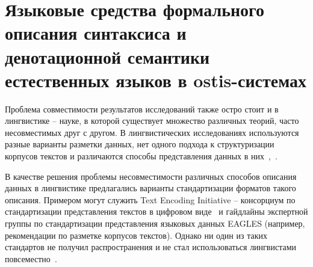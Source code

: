 \chapter{Языковые средства формального описания синтаксиса и денотационной семантики естественных языков в ostis-системах}
\label{chapter_lang}


Проблема совместимости результатов исследований также остро стоит и в лингвистике -- науке, в которой существует множество различных теорий, часто несовместимых друг с другом.
В лингвистических исследованиях используются разные варианты разметки данных, нет одного подхода к структуризации корпусов текстов и различаются способы представления данных в них~\cite{Farrar2002ACO},~\cite{Chiarcos2012}.

В качестве решения проблемы несовместимости различных способов описания данных в лингвистике предлагались варианты стандартизации форматов такого описания.
Примером могут служить Text Encoding Initiative -- консорциум по стандартизации представления текстов в цифровом виде~\cite{Text_Encoding_Initiative} и гайдлайны экспертной группы по стандартизации представления языковых данных EAGLES (например, рекомендации по разметке корпусов текстов\cite{EAGLES_Recommendations}). Однако ни один из таких стандартов не получил распространения и не стал использоваться лингвистами повсеместно~\cite[p.~4]{Ide2010WhatDI}.

